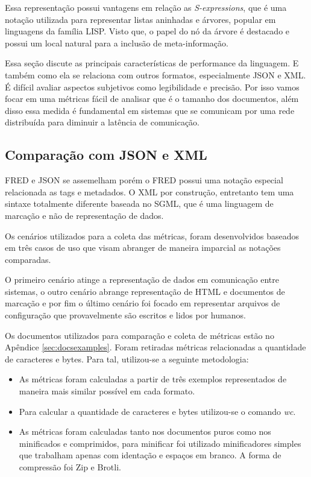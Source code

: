 Essa representação possui vantagens em relação as \textit{S-expressions}, que
é uma notação utilizada para representar listas aninhadas e árvores, popular em linguagens da família 
LISP. Visto que, o papel do nó da árvore é destacado e possui um local natural para a 
inclusão de meta-informação.

Essa seção discute as principais características de performance da linguagem. E também como ela 
se relaciona com outros formatos, especialmente JSON e XML. É difícil avaliar 
aspectos subjetivos como legibilidade e precisão. Por isso vamos focar em uma métricas fácil de 
analisar que é o tamanho dos documentos, além disso essa medida é fundamental em sistemas 
que se comunicam por uma rede distribuída para diminuir a latência de comunicação.

\subsection{Comparação com JSON e XML}

FRED e JSON se assemelham porém o FRED possui uma notação especial
relacionada as tags e metadados. O XML por construção, entretanto tem uma 
sintaxe totalmente diferente baseada no SGML, que é uma linguagem de marcação e não de
representação de dados.

Os cenários utilizados para a coleta das métricas, foram desenvolvidos
baseados em três casos de uso que visam abranger de maneira imparcial
as notações comparadas.

O primeiro cenário atinge a representação de dados em comunicação  
entre sistemas, o outro cenário abrange representação de HTML e documentos
de marcação e por fim o último cenário foi focado em representar arquivos de configuração que 
provavelmente são escritos e lidos por humanos.

Os documentos utilizados para comparação e coleta de métricas estão no Apêndice \ref{sec:docsexamples}.
Foram retiradas métricas relacionadas a quantidade de caracteres e bytes. Para tal, utilizou-se a seguinte
metodologia:

\begin{itemize}
    \item As métricas foram calculadas a partir de três exemplos representados 
    de maneira mais similar possível em cada formato.
    \item Para calcular a quantidade de caracteres e bytes utilizou-se o comando \textit{wc}.
    \item As métricas foram calculadas tanto nos documentos puros como nos minificados e 
    comprimidos, para minificar foi utilizado minificadores simples que trabalham apenas 
    com identação e espaços em branco. A forma de compressão foi Zip e Brotli.
\end{itemize}

